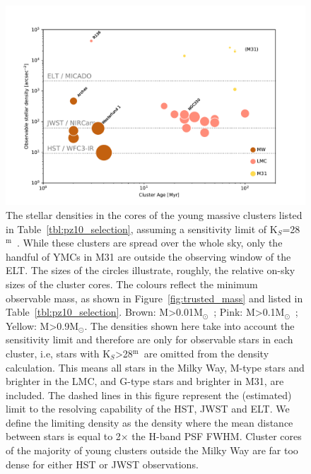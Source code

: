 \documentclass{aa}
\newcommand{\m}{$^\mathrm{m}$~}
\newcommand{\msun}{M$_\odot$~}
\newcommand{\msune}{M$_\odot$}
\begin{document}
\begin{figure}

    \centering
    \includegraphics[width=\textwidth]{star_density_vs_age.pdf}

    \caption{
    The stellar densities in the cores of the young massive clusters listed in Table~\ref{tbl:pz10_selection}, assuming a sensitivity limit of K$_S$=28\m.
    While these clusters are spread over the whole sky, only the handful of YMCs in M31 are outside the observing window of the ELT.
    The sizes of the circles illustrate, roughly, the relative on-sky sizes of the cluster cores.
    The colours reflect the minimum observable mass, as shown in Figure~\ref{fig:trusted_mass} and listed in Table~\ref{tbl:pz10_selection}.
    Brown: M\textgreater0.01\msun; Pink: M\textgreater0.1\msun; Yellow: M\textgreater0.9\msune.
    The densities shown here take into account the sensitivity limit and therefore are only for observable stars in each cluster, i.e, stars with K$_S$\textgreater28\m are omitted from the density calculation.
    This means all stars in the Milky Way, M-type stars and brighter in the LMC, and G-type stars and brighter in M31, are included.
    The dashed lines in this figure represent the (estimated) limit to the resolving capability of the HST, JWST and ELT.
    We define the limiting density as the density where the mean distance between stars is equal to 2$\times$ the H-band PSF FWHM.
    Cluster cores of the majority of young clusters outside the Milky Way are far too dense for either HST or JWST observations. }

    \label{fig:star_density_vs_age}

\end{figure}
\end{document}
